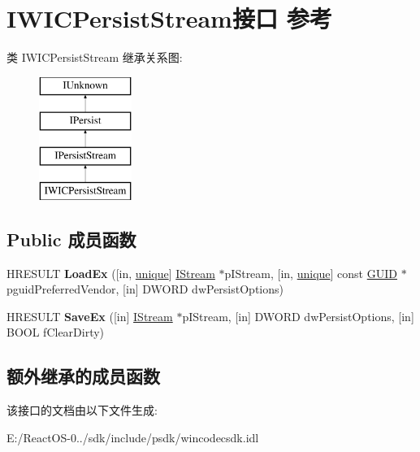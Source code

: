 \hypertarget{interface_i_w_i_c_persist_stream}{}\section{I\+W\+I\+C\+Persist\+Stream接口 参考}
\label{interface_i_w_i_c_persist_stream}
类 I\+W\+I\+C\+Persist\+Stream 继承关系图\+:\begin{figure}[H]
\begin{center}
\leavevmode
\includegraphics[height=4.000000cm]{interface_i_w_i_c_persist_stream}
\end{center}
\end{figure}
\subsection*{Public 成员函数}
\begin{DoxyCompactItemize}
\item 
\mbox{\label{interface_i_w_i_c_persist_stream_a6e504410d7f15a9c5397c62cd5e57372}} 
H\+R\+E\+S\+U\+LT {\bfseries Load\+Ex} (\mbox{[}in, \hyperlink{interfaceunique}{unique}\mbox{]} \hyperlink{interface_i_stream}{I\+Stream} $\ast$p\+I\+Stream, \mbox{[}in, \hyperlink{interfaceunique}{unique}\mbox{]} const \hyperlink{interface_g_u_i_d}{G\+U\+ID} $\ast$pguid\+Preferred\+Vendor, \mbox{[}in\mbox{]} D\+W\+O\+RD dw\+Persist\+Options)
\item 
\mbox{\label{interface_i_w_i_c_persist_stream_a6284710809a54e37be253b8e17d7b0d6}} 
H\+R\+E\+S\+U\+LT {\bfseries Save\+Ex} (\mbox{[}in\mbox{]} \hyperlink{interface_i_stream}{I\+Stream} $\ast$p\+I\+Stream, \mbox{[}in\mbox{]} D\+W\+O\+RD dw\+Persist\+Options, \mbox{[}in\mbox{]} B\+O\+OL f\+Clear\+Dirty)
\end{DoxyCompactItemize}
\subsection*{额外继承的成员函数}


该接口的文档由以下文件生成\+:\begin{DoxyCompactItemize}
\item 
E\+:/\+React\+O\+S-\/0../sdk/include/psdk/wincodecsdk.\+idl\end{DoxyCompactItemize}
